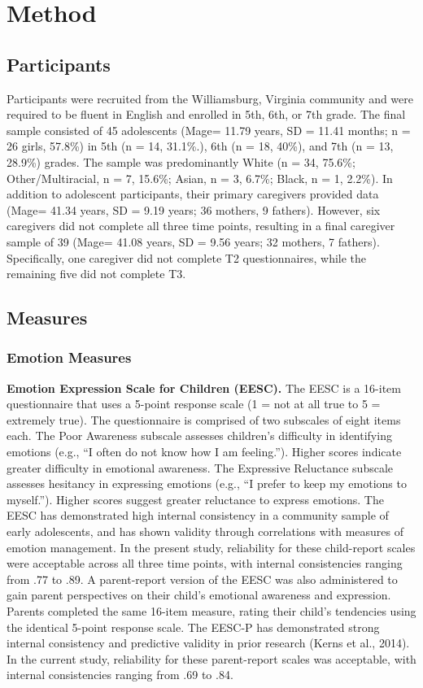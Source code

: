 \section{Method}
\subsection{Participants}
Participants were recruited from the Williamsburg, Virginia community and were required to be fluent in English and enrolled in 5th, 6th, or 7th grade. The final sample consisted of 45 adolescents (Mage= 11.79 years, SD = 11.41 months; n = 26 girls, 57.8\%) in 5th (n = 14, 31.1\%.), 6th (n = 18, 40\%), and 7th (n = 13, 28.9\%) grades. The sample was predominantly White (n = 34, 75.6\%; Other/Multiracial, n = 7, 15.6\%; Asian, n = 3, 6.7\%; Black, n = 1, 2.2\%). 
In addition to adolescent participants, their primary caregivers provided data (Mage= 41.34 years, SD = 9.19 years; 36 mothers, 9 fathers). However, six caregivers did not complete all three time points, resulting in a final caregiver sample of 39 (Mage= 41.08 years, SD = 9.56 years; 32 mothers, 7 fathers). Specifically, one caregiver did not complete T2 questionnaires, while the remaining five did not complete T3. 
\subsection{Measures}
\subsubsection{Emotion Measures}
\textbf{Emotion Expression Scale for Children (EESC).} The EESC  is a 16-item questionnaire that uses a 5-point response scale (1 = not at all true to 5 = extremely true). The questionnaire is comprised of two subscales of eight items each. The Poor Awareness subscale assesses children’s difficulty in identifying emotions (e.g., “I often do not know how I am feeling.”). Higher scores indicate greater difficulty in emotional awareness. The Expressive Reluctance subscale assesses hesitancy in expressing emotions (e.g., “I prefer to keep my emotions to myself.”). Higher scores suggest greater reluctance to express emotions. The EESC has demonstrated high internal consistency in a community sample of early adolescents, and has shown validity through correlations with measures of emotion management. In the present study, reliability for these child-report scales were acceptable across all three time points, with internal consistencies ranging from .77 to .89. 
A parent-report version of the EESC  was also administered to gain parent perspectives on their child’s emotional awareness and expression. Parents completed the same 16-item measure, rating their child’s tendencies using the identical 5-point response scale. The EESC-P has demonstrated strong internal consistency and predictive validity in prior research (Kerns et al., 2014). In the current study, reliability for these parent-report scales was acceptable, with internal consistencies ranging from .69 to .84.
